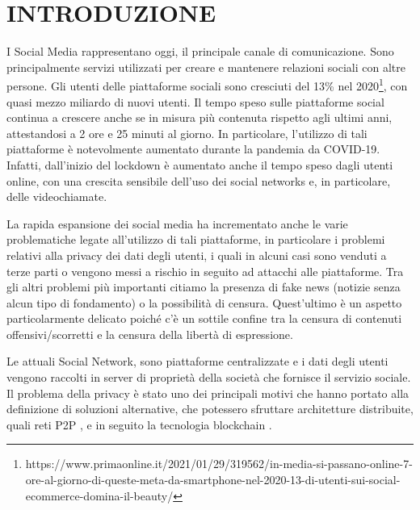 \chapter{INTRODUZIONE}
I Social Media rappresentano oggi, il principale canale di comunicazione. Sono principalmente servizi utilizzati per creare e mantenere relazioni sociali con altre persone. Gli utenti delle piattaforme sociali sono cresciuti del 13\% nel 2020\footnote{https://www.primaonline.it/2021/01/29/319562/in-media-si-passano-online-7-ore-al-giorno-di-queste-meta-da-smartphone-nel-2020-13-di-utenti-sui-social-ecommerce-domina-il-beauty/}, con quasi mezzo miliardo di nuovi utenti. Il tempo speso sulle piattaforme social continua a crescere anche se in misura più contenuta rispetto agli ultimi anni, attestandosi a 2 ore e 25 minuti al giorno. In particolare, l'utilizzo di tali piattaforme è notevolmente aumentato durante la pandemia da COVID-19. Infatti, dall’inizio del lockdown è aumentato anche il tempo speso dagli utenti online, con una crescita sensibile dell’uso dei social networks e, in particolare, delle videochiamate. 

La rapida espansione dei social media ha incrementato anche le varie problematiche legate all'utilizzo di tali piattaforme, in particolare i problemi relativi alla privacy dei dati degli utenti, i quali in alcuni casi sono venduti a terze parti o vengono messi a rischio in seguito ad attacchi alle piattaforme. Tra gli altri problemi più importanti citiamo la presenza di fake news \cite{lazer2018science} (notizie senza alcun tipo di fondamento) o la possibilità di censura. Quest'ultimo è un aspetto particolarmente delicato poiché c'è un sottile confine tra la censura di contenuti offensivi/scorretti e la censura della libertà di espressione.

Le attuali Social Network, sono piattaforme centralizzate e i dati degli utenti vengono raccolti in server di proprietà della società che fornisce il servizio sociale.
Il problema della privacy è stato uno dei principali motivi che hanno portato alla definizione di soluzioni alternative, che potessero sfruttare architetture distribuite, quali reti P2P \cite{datta2010decentralized}, e in seguito la tecnologia blockchain \cite{guidi2020blockchain}.


